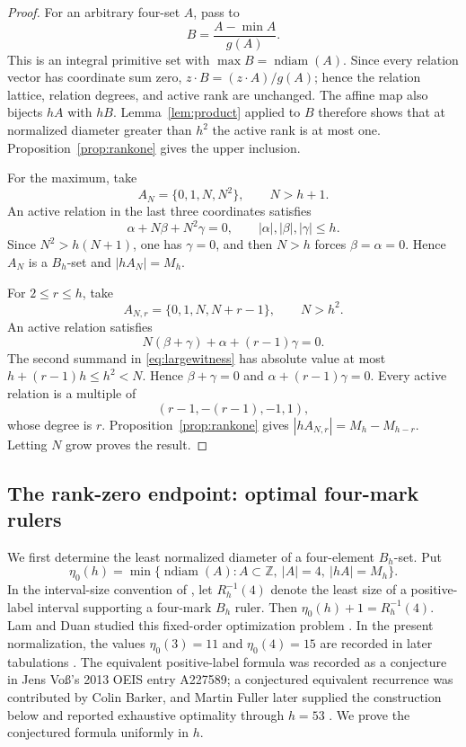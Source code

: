 \documentclass[11pt,reqno]{amsart}
\theoremstyle{definition}
\theoremstyle{remark}
\newcommand{\Z}{\mathbb Z}
\newcommand{\ndiam}{\operatorname{ndiam}}
\begin{document}
\begin{proof}
For an arbitrary four-set $A$, pass to
\[
 B=\frac{A-\min A}{g(A)}.
\]
This is an integral primitive set with $\max B=\ndiam(A)$.  Since every
relation vector has coordinate sum zero, $z\cdot B=(z\cdot A)/g(A)$;
hence the relation lattice, relation degrees, and active rank are unchanged.
The affine map also bijects $hA$ with $hB$.  Lemma~\ref{lem:product} applied
to $B$ therefore shows that at normalized diameter greater than $h^2$ the
active rank is at most one.  Proposition~\ref{prop:rankone} gives the upper
inclusion.

For the maximum, take
\[
 A_N=\{0,1,N,N^2\},\qquad N>h+1.
\]
An active relation in the last three coordinates satisfies
\[
 \alpha+N\beta+N^2\gamma=0,
 \qquad |\alpha|,|\beta|,|\gamma|\leq h.
\]
Since $N^2>h(N+1)$, one has $\gamma=0$, and then $N>h$ forces
$\beta=\alpha=0$.  Hence $A_N$ is a $B_h$-set and $|hA_N|=M_h$.

For $2\leq r\leq h$, take
\[
 A_{N,r}=\{0,1,N,N+r-1\},\qquad N>h^2.
\]
An active relation satisfies
\begin{equation}\label{eq:largewitness}
 N(\beta+\gamma)+\alpha+(r-1)\gamma=0.
\end{equation}
The second summand in \eqref{eq:largewitness} has absolute value at most
$h+(r-1)h\leq h^2<N$.  Hence $\beta+\gamma=0$ and
$\alpha+(r-1)\gamma=0$.  Every active relation is a multiple of
\[
 (r-1,-(r-1),-1,1),
\]
whose degree is $r$.  Proposition~\ref{prop:rankone} gives
$|hA_{N,r}|=M_h-M_{h-r}$.  Letting $N$ grow proves the result.
\end{proof}

\subsection{The rank-zero endpoint: optimal four-mark rulers}

We first determine the least normalized diameter of a four-element
$B_h$-set.  Put
\[
 \eta_0(h)=\min\{\ndiam(A):A\subset\Z,\ |A|=4,\ |hA|=M_h\}.
\]
In the interval-size convention of \cite{OBryantThick2024}, let
$R_h^{-1}(4)$ denote the least size of a positive-label interval supporting
a four-mark $B_h$ ruler.  Then $\eta_0(h)+1=R_h^{-1}(4)$.  Lam and Duan
studied this fixed-order optimization problem \cite{LamDuan1989}.  In the
present normalization, the values $\eta_0(3)=11$ and $\eta_0(4)=15$ are
recorded in later tabulations
\cite{OBryantThick2024,MartosDelgadoTrujillo2021}.  The equivalent
positive-label formula was
recorded as a conjecture in Jens Vo{\ss}'s 2013 OEIS entry A227589;
a conjectured equivalent recurrence was contributed by Colin Barker, and Martin Fuller
later supplied the construction below and reported exhaustive optimality
through $h=53$ \cite{OEISA227589}.  We prove the conjectured formula
uniformly in $h$.
\end{document}
